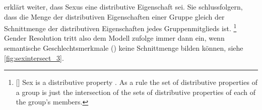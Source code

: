 \begin{exe}
\end{exe}

\citet[576]{wechsler2009} \citep[vgl.~auch][182]{wechslerzlatic2003} erklärt
weiter, dass Sexus eine distributive Eigenschaft sei. Sie schlussfolgern, dass
die Menge der distributiven Eigenschaften einer Gruppe gleich der Schnittmenge
der distributiven Eigenschaften jedes Gruppenmitglieds ist.%
%
	\footnote{[{\cites[576]{wechsler2009}[vgl.][182]{wechslerzlatic2003}}]{%
		Sex is a distributive property \textelp{}. As a rule the set of
		distributive properties of a group is just the intersection of the sets
		of distributive properties of each of the group's members}.
	}
%
Gender Resolution tritt also dem Modell zufolge immer dann ein, wenn
semantische Geschlechtsmerkmale (\Sex) keine Schnittmenge bilden können, siehe
\cref{fig:sexintersect_3}.

